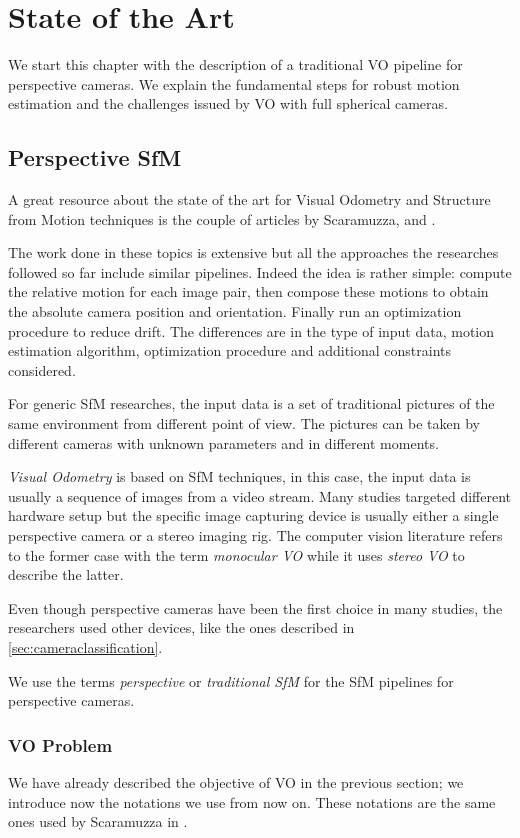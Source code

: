 \chapter{State of the Art}
\label{ch:state_of_the_art}
We start this chapter with the description of a traditional VO pipeline for 
perspective cameras. We explain the fundamental steps for robust motion 
estimation and the challenges issued by VO with full spherical cameras.

\section{Perspective SfM}
A great resource about the state of the art for Visual Odometry and Structure 
from Motion techniques is the couple of articles by Scaramuzza,  
\cite{scaramuzzaVisualOdometryI} and \cite{scaramuzzaVisualOdometryII}.

The work done in these topics is extensive but all the approaches the 
researches followed so far include similar pipelines.
Indeed the idea is rather simple: compute the relative motion for each image
pair, then compose these motions to obtain the absolute camera position and 
orientation. Finally run an optimization procedure to reduce drift.
The differences are in the type of input data, motion estimation algorithm,
 optimization procedure and additional constraints considered.

For generic SfM researches, the input data is a set of traditional pictures of 
the same environment from different point of view. The pictures can be taken by 
different cameras with unknown parameters and in different moments.

\textit{Visual Odometry} is based on SfM techniques, 
in this case, the input data is usually a sequence 
of images from a video stream. Many studies targeted different hardware setup 
but the specific image capturing device is usually either a single perspective 
camera or a stereo imaging rig. The computer vision literature refers to the
former case with the term \textit{monocular VO} while it uses \textit{stereo VO}
to describe the latter.

Even though perspective cameras have been the first choice in many studies, 
the researchers used other devices, like the ones described in 
\ref{sec:cameraclassification}.

We use the terms \textit{perspective} or \textit{traditional SfM} for the 
SfM pipelines for perspective cameras.

\subsection{VO Problem}
We have already described the objective of VO in the previous section; we
introduce now the notations we use from now on. These notations are the same 
ones used by Scaramuzza in \cite{scaramuzzaVisualOdometryI}.

